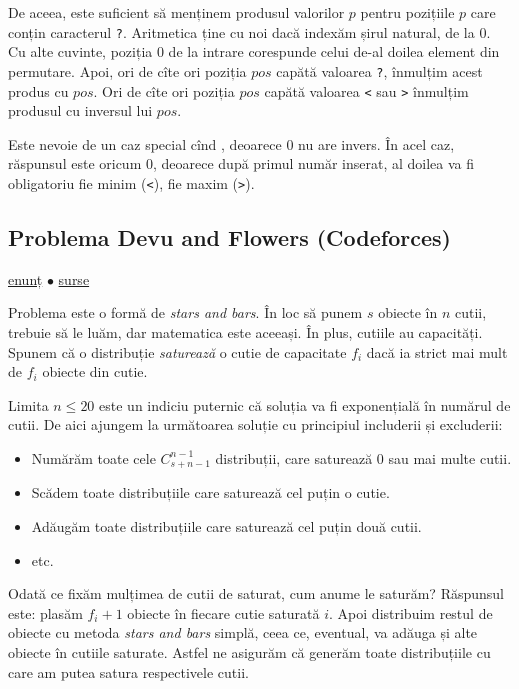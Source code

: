 \documentclass[../main.tex]{subfiles}
\begin{document}
De aceea, este suficient să menținem produsul valorilor $p$ pentru pozițiile $p$ care conțin caracterul \texttt{?}. Aritmetica ține cu noi dacă indexăm șirul natural, de la 0. Cu alte cuvinte, poziția 0 de la intrare corespunde celui de-al doilea element din permutare. Apoi, ori de cîte ori poziția $pos$ capătă valoarea \texttt{?}, înmulțim acest produs cu $pos$. Ori de cîte ori poziția $pos$ capătă valoarea \texttt{<} sau \texttt{>} înmulțim produsul cu inversul lui $pos$.

Este nevoie de un caz special cînd , deoarece 0 nu are invers. În acel caz, răspunsul este oricum 0, deoarece după primul număr inserat, al doilea va fi obligatoriu fie minim (\texttt{<}), fie maxim (\texttt{>}).

\subsection{Problema Devu and Flowers (Codeforces)}
\label{problem:devu-and-flowers}

\href{https://codeforces.com/contest/451/problem/E}{enunț}
$\bullet$
\hyperref[code:devu-and-flowers]{surse}

Problema este o formă de \textit{stars and bars}. În loc să punem $s$ obiecte în $n$ cutii, trebuie să le luăm, dar matematica este aceeași. În plus, cutiile au capacități. Spunem că o distribuție \textit{saturează} o cutie de capacitate $f_i$ dacă ia strict mai mult de $f_i$ obiecte din cutie.

Limita $n \leq 20$ este un indiciu puternic că soluția va fi exponențială în numărul de cutii. De aici ajungem la următoarea soluție cu principiul includerii și excluderii:

\begin{itemize}
  \item Numărăm toate cele $C_{s + n - 1}^{n-1}$ distribuții, care saturează 0 sau mai multe cutii.
  \item Scădem toate distribuțiile care saturează cel puțin o cutie.
  \item Adăugăm toate distribuțiile care saturează cel puțin două cutii.
  \item etc.
\end{itemize}

Odată ce fixăm mulțimea de cutii de saturat, cum anume le saturăm? Răspunsul este: plasăm $f_{i} + 1$ obiecte în fiecare cutie saturată $i$. Apoi distribuim restul de obiecte cu metoda \textit{stars and bars} simplă, ceea ce, eventual, va adăuga și alte obiecte în cutiile saturate. Astfel ne asigurăm că generăm toate distribuțiile cu care am putea satura respectivele cutii.
\end{document}
